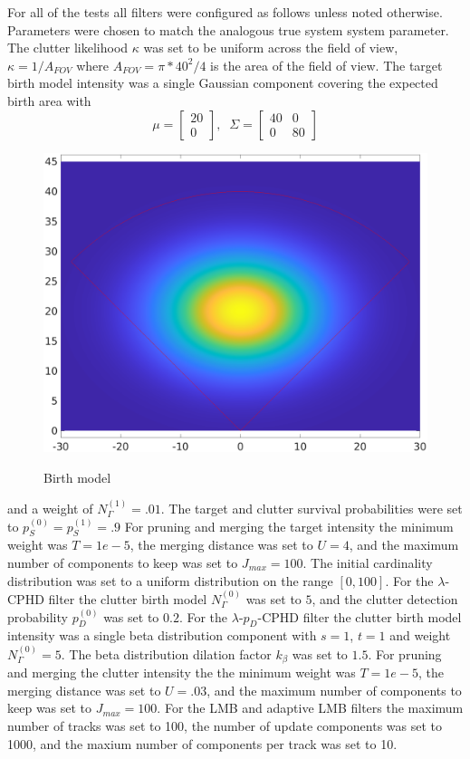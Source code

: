 \documentclass{article}
\newcommand{\clut}{{(0)}}
\newcommand{\tgt}{{(1)}}
\begin{document}
For all of the tests all filters were configured as follows unless noted otherwise. Parameters were chosen to match the analogous true system system parameter. The clutter likelihood $\kappa$ was set to be uniform across the field of view, $\kappa = 1/A_{FOV}$ where $A_{FOV} = \pi * 40^2/4$ is the area of the field of view. The target birth model intensity was a single Gaussian component covering the expected birth area with
\begin{equation}
  \label{eq:target_birth_model}
  \mu =
  \begin{bmatrix}
    20 \\
    0
  \end{bmatrix},\;\;
  \Sigma =
  \begin{bmatrix}
    40 & 0 \\
    0 & 80
  \end{bmatrix}
\end{equation}

\begin{figure}[H]
  \centering
  \includegraphics[width=.75\linewidth]{bm2.png}
  \label{fig:birth_model}
  \caption{Birth model}
\end{figure}
and a weight of $N_\Gamma^\tgt = .01$. The target and clutter survival probabilities were set to $p_S^\clut = p_S^\tgt = .9$ For pruning and merging the target intensity the minimum weight was $T = 1e-5$, the merging distance was set to $U = 4$, and the maximum number of components to keep was set to $J_{max} = 100$. The initial cardinality distribution was set to a uniform distribution on the range $[0, 100]$. For the $\lambda$-CPHD filter the clutter birth model $N_\Gamma^\clut$ was set to $5$, and the clutter detection probability $p_D^\clut$ was set to $0.2$. For the $\lambda$-$p_D$-CPHD filter the clutter birth model intensity was a single beta distribution component with $s=1$, $t=1$ and weight $N_\Gamma^\clut = 5$. The beta distribution dilation factor $k_\beta$ was set to $1.5$. For pruning and merging the clutter intensity the the minimum weight was $T = 1e-5$, the merging distance was set to $U = .03$, and the maximum number of components to keep was set to $J_{max} = 100$. For the LMB and adaptive LMB filters the maximum number of tracks was set to 100, the number of update components was set to 1000, and the maxium number of components per track was set to 10. \\
\end{document}
